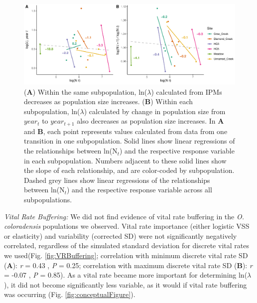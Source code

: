 \documentclass[12pt, letterpaper]{article}
\begin{document}
\begin{figure}[h!]
  \centering
  \includegraphics[width=\textwidth]{figures/densityDependenceFigure.pdf}
  \caption{\internallinenumbers (\textbf{A}) Within the same subpopulation, ln($\lambda$) calculated from IPMs decreases as population size increases. (\textbf{B}) Within each subpopulation, ln($\lambda$) calculated by change in population size from $year_{t}$ to $year_{t+1}$ also decreases as population size increases. In \textbf{A} and \textbf{B}, each point represents values calculated from data from one transition in one subpopulation. Solid lines show linear regressions of the relationships between ln(N$_t$) and the respective response variable in each subpopulation. Numbers adjacent to these solid lines show the slope of each relationship, and are color-coded by subpopulation. Dashed grey lines show linear regressions of the relationships between ln(N$_t$) and the respective response variable across all subpopulations.}
  \label{fig:DDFig}
\end{figure} 

\textit{Vital Rate Buffering:} We did not find evidence of vital rate buffering in the \textit{O. coloradensis} populations we observed. Vital rate importance (either logistic VSS or elasticity) and variability (corrected SD) were not significantly negatively correlated, regardless of the simulated standard deviation for discrete vital rates we used(Fig. \ref{fig:VRBuffering}; correlation with minimum discrete vital rate SD (\textbf{A}): \textit{r} = 0.43 , \textit{P} = 0.25; correlation with maximum discrete vital rate SD (\textbf{B}): \textit{r} = -0.07 , \textit{P} = 0.85). As a vital rate became more important for determining ln($\lambda$), it did not become significantly less variable, as it would if vital rate buffering was occurring (Fig. \ref{fig:conceptualFigure}).  
\end{document}
